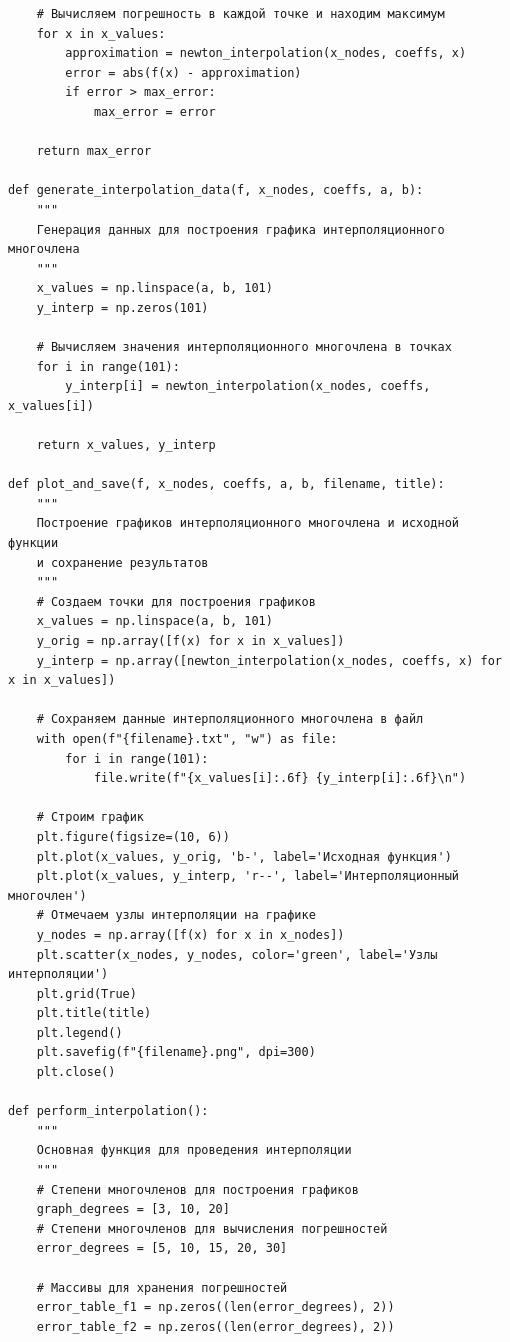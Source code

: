 \documentclass[12pt]{article}
\begin{document}
\begin{verbatim}
    # Вычисляем погрешность в каждой точке и находим максимум
    for x in x_values:
        approximation = newton_interpolation(x_nodes, coeffs, x)
        error = abs(f(x) - approximation)
        if error > max_error:
            max_error = error
    
    return max_error

def generate_interpolation_data(f, x_nodes, coeffs, a, b):
    """
    Генерация данных для построения графика интерполяционного многочлена
    """
    x_values = np.linspace(a, b, 101)
    y_interp = np.zeros(101)
    
    # Вычисляем значения интерполяционного многочлена в точках
    for i in range(101):
        y_interp[i] = newton_interpolation(x_nodes, coeffs, x_values[i])
    
    return x_values, y_interp

def plot_and_save(f, x_nodes, coeffs, a, b, filename, title):
    """
    Построение графиков интерполяционного многочлена и исходной функции
    и сохранение результатов
    """
    # Создаем точки для построения графиков
    x_values = np.linspace(a, b, 101)
    y_orig = np.array([f(x) for x in x_values])
    y_interp = np.array([newton_interpolation(x_nodes, coeffs, x) for x in x_values])
    
    # Сохраняем данные интерполяционного многочлена в файл
    with open(f"{filename}.txt", "w") as file:
        for i in range(101):
            file.write(f"{x_values[i]:.6f} {y_interp[i]:.6f}\n")
    
    # Строим график
    plt.figure(figsize=(10, 6))
    plt.plot(x_values, y_orig, 'b-', label='Исходная функция')
    plt.plot(x_values, y_interp, 'r--', label='Интерполяционный многочлен')
    # Отмечаем узлы интерполяции на графике
    y_nodes = np.array([f(x) for x in x_nodes])
    plt.scatter(x_nodes, y_nodes, color='green', label='Узлы интерполяции')
    plt.grid(True)
    plt.title(title)
    plt.legend()
    plt.savefig(f"{filename}.png", dpi=300)
    plt.close()

def perform_interpolation():
    """
    Основная функция для проведения интерполяции
    """
    # Степени многочленов для построения графиков
    graph_degrees = [3, 10, 20]
    # Степени многочленов для вычисления погрешностей
    error_degrees = [5, 10, 15, 20, 30]
    
    # Массивы для хранения погрешностей
    error_table_f1 = np.zeros((len(error_degrees), 2))
    error_table_f2 = np.zeros((len(error_degrees), 2))
    

\end{verbatim}
\end{document}
